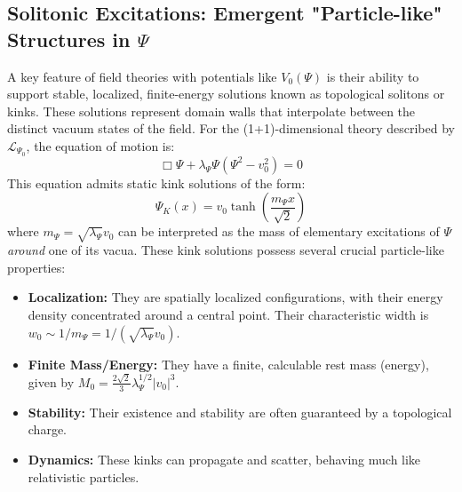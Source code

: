 \documentclass[11pt, a4paper]{book}
\begin{document}
\subsection{Solitonic Excitations: Emergent "Particle-like" Structures in $\Psi$}
\label{ssec:psisubstrate_solitons_mainpaper}
A key feature of field theories with potentials like $V_0(\Psi)$ is their ability to support stable, localized, finite-energy solutions known as topological solitons or kinks. These solutions represent domain walls that interpolate between the distinct vacuum states of the field. For the (1+1)-dimensional theory described by $\mathcal{L}_{\Psi_0}$, the equation of motion is:
\[ \Box \Psi + \lambda_\Psi \Psi (\Psi^2 - v_0^2) = 0 \]
This equation admits static kink solutions of the form:
\[ \Psi_K(x) = v_0 \tanh\left(\frac{m_\Psi x}{\sqrt{2}}\right) \]
where $m_\Psi = \sqrt{\lambda_\Psi} v_0$ can be interpreted as the mass of elementary excitations of $\Psi$ \emph{around} one of its vacua. These kink solutions possess several crucial particle-like properties:
\begin{itemize}
    \item \textbf{Localization:} They are spatially localized configurations, with their energy density concentrated around a central point. Their characteristic width is $w_0 \sim 1/m_\Psi = 1/(\sqrt{\lambda_\Psi} v_0)$.
    \item \textbf{Finite Mass/Energy:} They have a finite, calculable rest mass (energy), given by $M_0 = \frac{2\sqrt{2}}{3} \lambda_\Psi^{1/2} |v_0|^3$.
    \item \textbf{Stability:} Their existence and stability are often guaranteed by a topological charge.
    \item \textbf{Dynamics:} These kinks can propagate and scatter, behaving much like relativistic particles.
\end{itemize}
\end{document}
